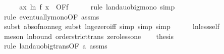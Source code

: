 \begin{isabellebody}
%
\isadelimproof
%
\endisadelimproof
%
\isatagproof
{}\isamarkupfalse%
\ {\isacharminus}{\kern0pt}\isanewline
\ \ \isamarkupfalse%
\ a{\isacharcolon}{\kern0pt}{\isachardoublequoteopen}{\isacharparenleft}{\kern0pt}{\isasymlambda}x{\isachardot}{\kern0pt}\ ln\ {\isacharparenleft}{\kern0pt}f\ x{\isacharparenright}{\kern0pt}{\isacharparenright}{\kern0pt}\ {\isasymin}\ O{\isacharbrackleft}{\kern0pt}F{\isacharprime}{\kern0pt}{\isacharbrackright}{\kern0pt}{\isacharparenleft}{\kern0pt}f{\isacharparenright}{\kern0pt}{\isachardoublequoteclose}\isanewline
\ \ \ \ \isamarkupfalse%
\ {\isacharparenleft}{\kern0pt}rule\ landau{\isacharunderscore}{\kern0pt}o{\isachardot}{\kern0pt}big{\isacharunderscore}{\kern0pt}mono{\isacharcomma}{\kern0pt}\ simp{\isacharparenright}{\kern0pt}\isanewline
\ \ \ \ \isamarkupfalse%
\ {\isacharparenleft}{\kern0pt}rule\ eventually{\isacharunderscore}{\kern0pt}mono{\isacharbrackleft}{\kern0pt}OF\ assms{\isacharparenleft}{\kern0pt}{}{\isacharparenright}{\kern0pt}{\isacharbrackright}{\kern0pt}{\isacharparenright}{\kern0pt}\isanewline
\ \ \ \ \isamarkupfalse%
\ {\isacharparenleft}{\kern0pt}subst\ abs{\isacharunderscore}{\kern0pt}of{\isacharunderscore}{\kern0pt}nonneg{\isacharcomma}{\kern0pt}\ subst\ ln{\isacharunderscore}{\kern0pt}ge{\isacharunderscore}{\kern0pt}zero{\isacharunderscore}{\kern0pt}iff{\isacharcomma}{\kern0pt}\ simp{\isacharcomma}{\kern0pt}\ simp{\isacharcomma}{\kern0pt}\ simp{\isacharparenright}{\kern0pt}\isanewline
\ \ \ \ \isamarkupfalse%
\ ln{\isacharunderscore}{\kern0pt}less{\isacharunderscore}{\kern0pt}self\ \isanewline
\ \ \ \ \isamarkupfalse%
\ {\isacharparenleft}{\kern0pt}meson\ ln{\isacharunderscore}{\kern0pt}bound\ order{\isachardot}{\kern0pt}strict{\isacharunderscore}{\kern0pt}trans{}\ zero{\isacharunderscore}{\kern0pt}less{\isacharunderscore}{\kern0pt}one{\isacharparenright}{\kern0pt}\isanewline
\ \ \isamarkupfalse%
\ {\isacharquery}{\kern0pt}thesis\isanewline
\ \ \ \ \isamarkupfalse%
\ {\isacharparenleft}{\kern0pt}rule\ landau{\isacharunderscore}{\kern0pt}o{\isachardot}{\kern0pt}big{\isacharunderscore}{\kern0pt}trans{\isacharbrackleft}{\kern0pt}OF\ a\ assms{\isacharparenleft}{\kern0pt}{}{\isacharparenright}{\kern0pt}{\isacharbrackright}{\kern0pt}{\isacharparenright}{\kern0pt}\isanewline
{}\isamarkupfalse%
%
\endisatagproof
{\isafoldproof}%
%
\isadelimproof
\isanewline
%
\endisadelimproof
\isanewline
{}\isamarkupfalse%

\end{isabellebody}
